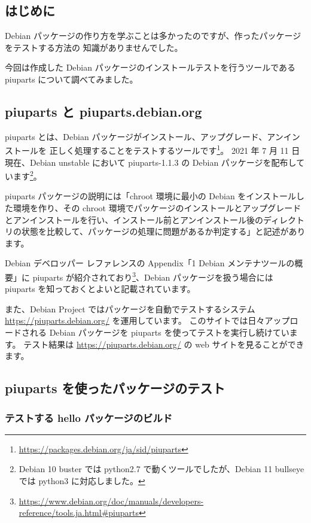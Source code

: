\documentclass[mingoth,a4paper]{jsarticle}
\begin{document}
\subsection{はじめに}

Debian パッケージの作り方を学ぶことは多かったのですが、作ったパッケージをテストする方法の
知識がありませんでした。

今回は作成した Debian パッケージのインストールテストを行うツールである
piuparts について調べてみました。


\subsection{piuparts と piuparts.debian.org}

piuparts とは、Debian パッケージがインストール、アップグレード、アンインストールを
正しく処理することをテストするツールです\footnote{\url{https://packages.debian.org/ja/sid/piuparts}}。
2021 年 7 月 11 日現在、Debian unstable において piuparts-1.1.3 の Debian パッケージを配布しています\footnote{Debian 10 buster では python2.7 で動くツールでしたが、Debian 11 bullseye では python3 に対応しました。}。


piuparts パッケージの説明には「chroot 環境に最小の Debian をインストールした環境を作り、その chroot 環境でパッケージのインストールとアップグレードとアンインストールを行い、インストール前とアンインストール後のディレクトリの状態を比較して、パッケージの処理に問題があるか判定する」と記述があります。


Debian デベロッパー レファレンスの Appendix「1 Debian メンテナツールの概要」に piuparts が紹介されており\footnote{\url{https://www.debian.org/doc/manuals/developers-reference/tools.ja.html\#piuparts}}、Debian パッケージを扱う場合には piuparts を知っておくとよいと記載されています。


また、Debian Project ではパッケージを自動でテストするシステム \url{https://piuparts.debian.org/} を運用しています。
このサイトでは日々アップロードされる Debian パッケージを piuparts を使ってテストを実行し続けています。
テスト結果は \url{https://piuparts.debian.org/} の web サイトを見ることができます。


\subsection{piuparts を使ったパッケージのテスト}

\subsubsection{テストする hello パッケージのビルド}
\end{document}
